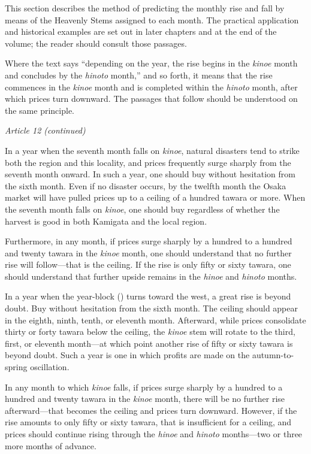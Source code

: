 \commentary
This section describes the method of predicting the monthly rise and
fall by means of the Heavenly Stems assigned to each month. The
practical application and historical examples are set out in later
chapters and at the end of the volume; the reader should consult those
passages.

Where the text says ``depending on the year, the rise begins in the
\textit{kinoe} month and concludes by the \textit{hinoto} month,'' and
so forth, it means that the rise commences in the \textit{kinoe} month
and is completed within the \textit{hinoto} month, after which prices
turn downward. The passages that follow should be understood on the same
principle.

\begin{sokyubox}
{\small\itshape\color{sokyubar} Article 12 (continued)}

\medskip
In a year when the seventh month falls on \textit{kinoe}, natural
disasters tend to strike both the  region and this
locality, and prices frequently surge sharply from the seventh month
onward. In such a year, one should buy without hesitation from the sixth
month. Even if no disaster occurs, by the twelfth month the Osaka market
will have pulled prices up to a ceiling of a hundred tawara or more.
When the seventh month falls on \textit{kinoe}, one should buy regardless
of whether the harvest is good in both Kamigata and the local region.

Furthermore, in any month, if prices surge sharply by a hundred to a
hundred and twenty tawara in the \textit{kinoe} month, one should
understand that no further rise will follow---that is the ceiling. If the
rise is only fifty or sixty tawara, one should understand that further
upside remains in the \textit{hinoe} and \textit{hinoto} months.

In a year when the year-block () turns toward
the west, a great rise is beyond doubt. Buy without hesitation from the
sixth month. The ceiling should appear in the eighth, ninth, tenth, or
eleventh month. Afterward, while prices consolidate thirty or forty
tawara below the ceiling, the \textit{kinoe} stem will rotate to the
third, first, or eleventh month---at which point another rise of fifty
or sixty tawara is beyond doubt. Such a year is one in which profits are
made on the autumn-to-spring oscillation.
\end{sokyubox}

\commentary
In any month to which \textit{kinoe} falls, if prices surge sharply by a
hundred to a hundred and twenty tawara in the \textit{kinoe} month,
there will be no further rise afterward---that becomes the ceiling and
prices turn downward. However, if the rise amounts to only fifty or
sixty tawara, that is insufficient for a ceiling, and prices should
continue rising through the \textit{hinoe} and \textit{hinoto}
months---two or three more months of advance.

